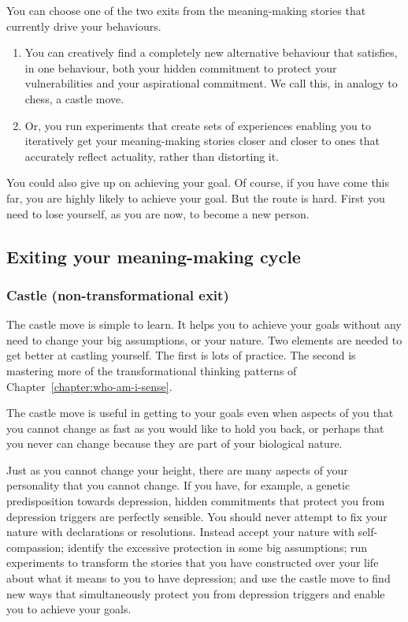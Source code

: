 You can choose one of the two exits from the meaning-making stories that currently drive your behaviours. 


\begin{enumerate}
\item You can creatively find a completely new alternative behaviour that satisfies, in one behaviour, both your hidden commitment to protect your vulnerabilities and your aspirational commitment. We call this, in analogy to chess, a castle move. 
\item Or, you run experiments that create sets of experiences enabling you to iteratively get your meaning-making stories closer and closer to ones that accurately reflect actuality, rather than distorting it.
\end{enumerate}


You could also give up on achieving your goal. Of course, if you have come this far, you are highly likely to achieve your goal. But the route is hard. First you need to lose yourself, as you are now, to become a new person. 


\subsection{Exiting your meaning-making cycle}
\subsubsection{Castle (non-transformational exit)}
The castle move is simple to learn. It helps you to achieve your goals without any need to change your big assumptions, or your nature. Two elements are needed to get better at castling yourself. The first is lots of practice. The second is mastering more of the transformational thinking patterns of Chapter~\ref{chapter:who-am-i-sense}.


The castle move is useful in getting to your goals even when aspects of you that you cannot change as fast as you would like to hold you back, or perhaps that you never can change because they are part of your biological nature.


Just as you cannot change your height, there are many aspects of your personality that you cannot change. If you have, for example, a genetic predisposition towards depression, hidden commitments that protect you from depression triggers are perfectly sensible. You should never attempt to fix your nature with declarations or resolutions. Instead accept your nature with self-compassion; identify the excessive protection in some big assumptions; run experiments to transform the stories that you have constructed over your life about what it means to you to have depression; and use the castle move to find new ways that simultaneously protect you from depression triggers and enable you to achieve your goals.


